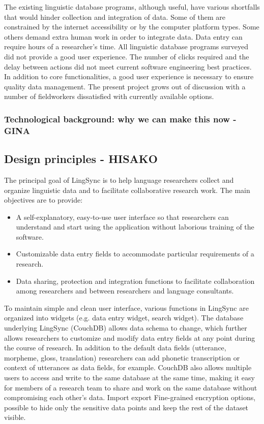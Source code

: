\documentclass[letterpaper, 12pt, dvips]{mitwpl}
\begin{document}
The existing linguistic database programs, although useful, have various shortfalls
that would hinder collection and integration of data. Some of them are constrained by
the internet accessibility or by the computer platform types. Some others demand extra
human work in order to integrate data. Data entry can require hours of a researcher's
time. All linguistic database programs surveyed did not provide a good user experience.
The number of clicks required and the delay between actions did not meet current
software engineering best practices. In addition to core functionalities, a good user
experience is necessary to ensure quality data management. The present project grows
out of discussion with a number of fieldworkers dissatisfied with currently available
options.


\subsubsection{Technological background: why we can make this now - GINA} 

\subsection{Design principles - HISAKO} 
\label{sec:design}

The principal goal of LingSync is to help language researchers collect and organize linguistic data and to facilitate collaborative research work. The main objectives are to provide: 

\begin{itemize} 
\item A self-explanatory, easy-to-use user interface so that researchers can understand and start using the application without laborious training of the software.  
\item Customizable data entry fields to accommodate particular requirements of a research.  
\item Data sharing, protection and integration functions to facilitate collaboration among researchers and between researchers and language consultants. 
\end{itemize} 

To maintain simple and clean user interface, various functions in LingSync are organized into widgets (e.g. data entry widget, search widget). %
The database underlying LingSync (CouchDB) allows data schema to change, which further allows researchers to customize and modify data entry fields at any point during the course of research. In addition to the default data fields (utterance, morpheme, gloss, translation) researchers can add phonetic transcription or context of utterances as data fields, for example. CouchDB also allows multiple users to access and write to the same database at the same time, making it easy for members of a research team to share and work on the same database without compromising each other's data.  
Import export 
Fine-grained encryption options, possible to hide only the sensitive data points and keep the rest of the dataset visible. 
\end{document}
